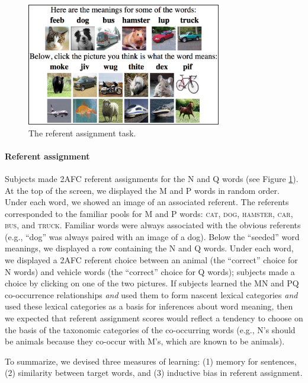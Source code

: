 \documentclass[man,floatsintext]{apa6}
\begin{document}
\begin{figure}[t]
  \begin{center}
    \includegraphics[width=8.5cm]{meaning-html-cropped.png}
    \caption{The referent assignment task.}
    \label{meaning-task}
  \end{center}
\end{figure}

\paragraph{Referent assignment} Subjects made 2AFC referent
assignments for the N and Q words (see Figure \ref{meaning-task}). At
the top of the screen, we displayed the M and P words in random
order. Under each word, we showed an image of an associated
referent. The referents corresponded to the familiar pools for M and P
words: \textsc{cat}, \textsc{dog}, \textsc{hamster}, \textsc{car},
\textsc{bus}, and \textsc{truck}. Familiar words were always
associated with the obvious referents (e.g., ``dog'' was always paired
with an image of a dog). Below the ``seeded'' word meanings, we
displayed a row containing the N and Q words. Under each word, we
displayed a 2AFC referent choice between an animal (the ``correct''
choice for N words) and vehicle words (the ``correct'' choice for Q
words); subjects made a choice by clicking on one of the two
pictures. If subjects learned the MN and PQ co-occurrence
relationships \emph{and} used them to form nascent lexical categories
\emph{and} used these lexical categories as a basis for inferences
about word meaning, then we expected that referent assignment scores
would reflect a tendency to choose on the basis of the taxonomic
categories of the co-occurring words (e.g., N's should be animals
because they co-occur with M's, which are known to be animals).

To summarize, we devised three measures of learning: (1) memory for
sentences, (2) similarity between target words, and (3) inductive bias
in referent assignment.
\end{document}
